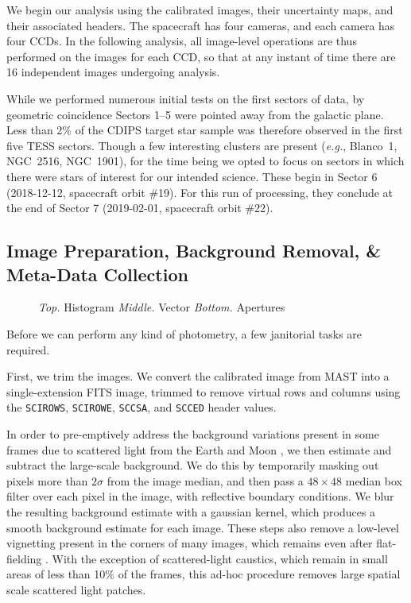 \documentclass[12pt,twocolumn,tighten]{aastex62}
\begin{document}
We begin our analysis using the calibrated images, their uncertainty
maps, and their associated headers.  The spacecraft has four cameras,
and each camera has four CCDs.  In the following analysis, all
image-level operations are thus performed on the images for each CCD,
so that at any instant of time there are 16 independent images
undergoing analysis.

While we performed numerous initial tests on the first sectors of data,
by geometric coincidence Sectors 1--5 were pointed away from the galactic plane.
Less than 2\% of the CDIPS target star sample
was therefore observed in the first five TESS sectors.
Though a few interesting clusters are present ({\it e.g.}, Blanco~1, NGC~2516, NGC~1901),
for the time being we opted to focus on sectors in which there were stars
of interest for our intended science.
These begin in Sector 6 (2018-12-12, spacecraft orbit \#19).
For this run of processing, they conclude at the end of Sector 7
(2019-02-01, spacecraft orbit \#22).

\subsection{Image Preparation, Background Removal, \& Meta-Data Collection}
\label{subsec:preparation}


\begin{figure}[!ht]
	\vspace{-0.8cm}
	\vspace{-0.8cm}
	\caption{
		{\it Top.} Histogram
		{\it Middle.} Vector
		{\it Bottom.} Apertures
	}
	\label{fig:astromresid}
\end{figure}



Before we can perform any kind of photometry, a few janitorial tasks
are required.

First, we trim the images.  We convert the calibrated image from MAST
into a single-extension FITS image, trimmed to remove virtual rows and
columns using the \texttt{SCIROWS}, \texttt{SCIROWE}, \texttt{SCCSA},
and \texttt{SCCED} header values.

In order to pre-emptively address the background
variations present in some frames due to scattered light from the
Earth and Moon \citep[see][\S 7.3.1--7.3.4]{vanderspek_2018},
we then estimate and subtract the large-scale background.
We do this by
temporarily masking out pixels more than $2\sigma$ from the image median,
and then pass a $48\times48$ median box filter over each pixel in
the image, with reflective boundary conditions. 
We blur the resulting background estimate with a gaussian kernel,
which produces a
smooth background estimate for each image.  These steps also remove
a low-level vignetting
present in the corners of many images, which remains even after
flat-fielding \citep[see][\S 7.3.5]{vanderspek_2018}.
With the exception of scattered-light caustics, which remain in small
areas of less than 10\% of the frames, this ad-hoc procedure removes
large spatial scale scattered light patches.
\end{document}
